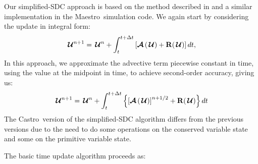 \documentclass[times,modern]{aastex63}
\newcommand{\castro}{{\sf Castro}}
\newcommand{\maestro}{{\sf Maestro}}
\newcommand{\Uc}{{\,\bm{\mathcal{U}}}}
\newcommand{\Rb}{{\bf R}}
\newcommand{\Adv}[1]{{\left [\boldsymbol{\mathcal{A}} \left(#1\right)\right]}}
\newcommand{\Advs}[1]{\boldsymbol{\mathcal{A}} \left(#1\right)}
\begin{document}
Our simplified-SDC approach is based on the method described in \citet{SDC-old} and
a similar implementation in the \maestro\ simulation code.
We again start by considering the update
in integral form:
\begin{equation}
\Uc^{n+1} = \Uc^n + \int_t^{t+\Delta t} \left [ \Advs{\Uc} + \Rb(\Uc) \right ] dt,
\end{equation}
In this approach, we 
approximate the advective term
piecewise constant in time, using the value at the midpoint in time,
to achieve second-order accuracy, giving us:
\begin{equation}
\label{eq:integral:simplesdc}
\Uc^{n+1} = \Uc^n + \int_t^{t+\Delta t} \left \{ \Adv{\Uc}^{n+1/2} + \Rb(\Uc) \right \} dt
\end{equation}
The \castro\ version of the simplified-SDC algorithm
differs from the previous versions due to the need to do some operations
on the conserved variable state and some on the primitive variable
state. 

The basic time update algorithm proceeds as:
\end{document}
